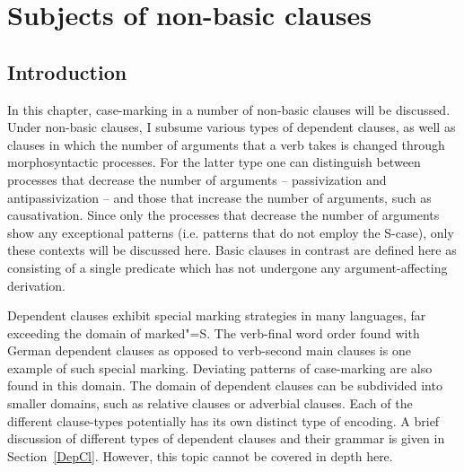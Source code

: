 \chapter{Subjects of non-basic clauses}\label{nonbasic}


\section{Introduction} 

In this chapter, case-marking in a number of non-basic clauses will be discussed. 
Under non-basic clauses, I subsume various types of dependent clauses, as well as clauses in which the number of arguments that a verb takes is changed through morphosyntactic processes. 
For the latter type one can distinguish between processes that decrease the number of arguments -- passivization and antipassivization -- and those that increase the number of arguments, such as causativation. 
Since only the processes that decrease the number of arguments show any exceptional patterns (i.e. patterns that do not employ the S-case), only these contexts will be discussed here.
Basic clauses in contrast are defined here as consisting of a single predicate which has not undergone any argument-affecting derivation. 

Dependent clauses exhibit special marking strategies in many languages, far exceeding the domain of marked"=S. 
The verb-final word order found with German dependent clauses as opposed to verb-second main clauses is one example of such special marking. 
Deviating patterns of case-marking are also found in this domain. 
The domain of dependent clauses can be subdivided into smaller domains, such as relative clauses or adverbial clauses. 
Each of the different clause-types potentially has its own distinct type of encoding. 
A brief discussion of different types of dependent clauses and their grammar is given in Section~\ref{DepCl}. 
However, this topic cannot be covered in depth here.

